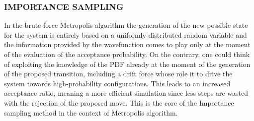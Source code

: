 \subsubsection{IMPORTANCE SAMPLING}
In the brute-force Metropolis algorithm the generation of the new possible state for the system is entirely based on a uniformly distributed random variable and the information provided by the wavefunction comes to play only at the moment of the evaluation of the acceptance probability. On the contrary, one could think of exploiting the knowledge of the PDF already at the moment of the generation of the proposed transition, including a drift force whose role it to drive the system towards high-probability configurations. This leads to an increased acceptance ratio, meaning a more efficient simulation since less steps are wasted with the rejection of the proposed move. This is the core of the Importance sampling method \cite{hastings} in the context of Metropolis algorithm.

